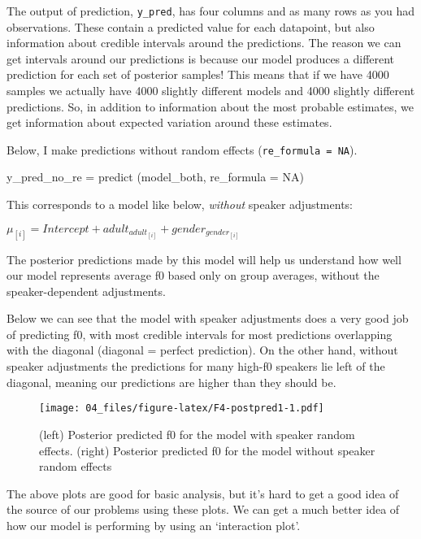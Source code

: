 \documentclass[
]{book}
\newenvironment{Shaded}{\begin{snugshade}}{\end{snugshade}}
\newcommand{\AttributeTok}[1]{\textcolor[rgb]{0.77,0.63,0.00}{#1}}
\newcommand{\ConstantTok}[1]{\textcolor[rgb]{0.00,0.00,0.00}{#1}}
\newcommand{\FunctionTok}[1]{\textcolor[rgb]{0.00,0.00,0.00}{#1}}
\newcommand{\NormalTok}[1]{#1}
\newcommand{\OtherTok}[1]{\textcolor[rgb]{0.56,0.35,0.01}{#1}}
\begin{document}
The output of prediction, \texttt{y\_pred}, has four columns and as many rows as you had observations. These contain a predicted value for each datapoint, but also information about credible intervals around the predictions. The reason we can get intervals around our predictions is because our model produces a different prediction for each set of posterior samples! This means that if we have 4000 samples we actually have 4000 slightly different models and 4000 slightly different predictions. So, in addition to information about the most probable estimates, we get information about expected variation around these estimates.

Below, I make predictions without random effects (\texttt{re\_formula\ =\ NA}).

\begin{Shaded}
\begin{Highlighting}[]
\NormalTok{y\_pred\_no\_re }\OtherTok{=} \FunctionTok{predict}\NormalTok{ (model\_both, }\AttributeTok{re\_formula =} \ConstantTok{NA}\NormalTok{)}
\end{Highlighting}
\end{Shaded}

This corresponds to a model like below, \emph{without} speaker adjustments:

\(\mu_{[i]} = Intercept + adult_{adult_{[i]}} + gender_{gender_{[i]}}\)

The posterior predictions made by this model will help us understand how well our model represents average f0 based only on group averages, without the speaker-dependent adjustments.

Below we can see that the model with speaker adjustments does a very good job of predicting f0, with most credible intervals for most predictions overlapping with the diagonal (diagonal = perfect prediction). On the other hand, without speaker adjustments the predictions for many high-f0 speakers lie left of the diagonal, meaning our predictions are higher than they should be.

\begin{figure}
\centering
\texttt{[image: 04\_files/figure-latex/F4-postpred1-1.pdf]}
\caption{\label{fig:F4-postpred1}(left) Posterior predicted f0 for the model with speaker random effects. (right) Posterior predicted f0 for the model without speaker random effects}
\end{figure}

The above plots are good for basic analysis, but it's hard to get a good idea of the source of our problems using these plots. We can get a much better idea of how our model is performing by using an `interaction plot'.
\end{document}
